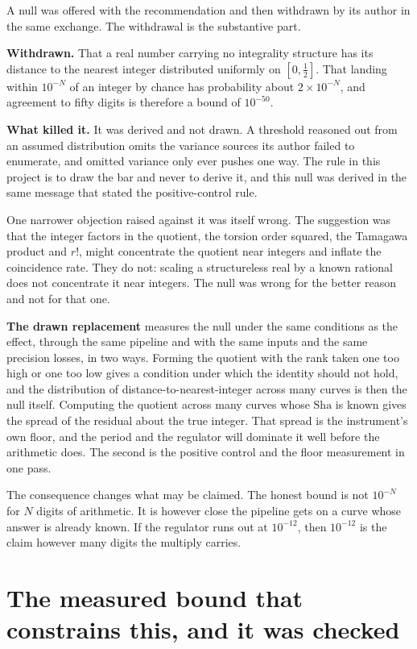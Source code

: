 A null was offered with the recommendation and then withdrawn by its author in the same exchange.
The withdrawal is the substantive part.

\textbf{Withdrawn.} That a real number carrying no integrality structure has its distance to the
nearest integer distributed uniformly on $[0,\tfrac12]$. That landing within $10^{-N}$ of an
integer by chance has probability about $2\times10^{-N}$, and agreement to fifty digits is
therefore a bound of $10^{-50}$.

\textbf{What killed it.} It was derived and not drawn. A threshold reasoned out from an assumed
distribution omits the variance sources its author failed to enumerate, and omitted variance only
ever pushes one way. The rule in this project is to draw the bar and never to derive it, and this
null was derived in the same message that stated the positive-control rule.

One narrower objection raised against it was itself wrong. The suggestion
was that the integer factors in the quotient, the torsion order squared, the Tamagawa product and
$r!$, might concentrate the quotient near integers and inflate the coincidence rate. They do not:
scaling a structureless real by a known rational does not concentrate it near integers. The null was
wrong for the better reason and not for that one.

\textbf{The drawn replacement} measures the null under the same conditions as the effect, through
the same pipeline and with the same inputs and the same precision losses, in two ways. Forming the
quotient with the rank taken one too high or one too low gives a condition under which the identity
should not hold, and the distribution of distance-to-nearest-integer across many curves is then the
null itself. Computing the quotient across many curves whose $\mathrm{Sha}$ is known gives the
spread of the residual about the true integer. That spread is the instrument's own floor, and the
period and the regulator will dominate it well before the arithmetic does. The second is the
positive control and the floor measurement in one pass.

The consequence changes what may be claimed. The honest bound is not $10^{-N}$ for $N$ digits of
arithmetic. It is however close the pipeline gets on a curve whose answer is already known. If the
regulator runs out at $10^{-12}$, then $10^{-12}$ is the claim however many digits the multiply
carries.

\section{The measured bound that constrains this, and it was checked}

